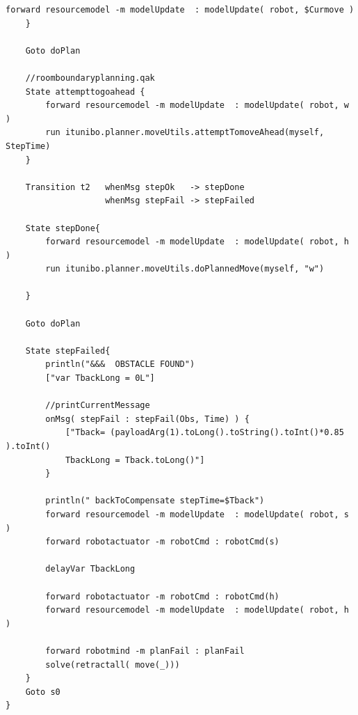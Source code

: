 \begin{lstlisting}[backgroundcolor=\color{white}, label={lst:planexecutor-ddr-sys-5}, caption={"Codice di planexecutor in ddrSystem5"}]
		forward resourcemodel -m modelUpdate  : modelUpdate( robot, $Curmove ) 
	}
	
	Goto doPlan
	
	//roomboundaryplanning.qak
	State attempttogoahead {	
		forward resourcemodel -m modelUpdate  : modelUpdate( robot, w ) 
		run itunibo.planner.moveUtils.attemptTomoveAhead(myself, StepTime)
	}
	
	Transition t2   whenMsg stepOk   -> stepDone   
					whenMsg stepFail -> stepFailed
					 
 	State stepDone{  
 		forward resourcemodel -m modelUpdate  : modelUpdate( robot, h ) 
 		run itunibo.planner.moveUtils.doPlannedMove(myself, "w")	
 		
 	}
 	
 	Goto doPlan
 	
 	State stepFailed{
 		println("&&&  OBSTACLE FOUND") 
		["var TbackLong = 0L"]		 
 	  	
		//printCurrentMessage		        
 		onMsg( stepFail : stepFail(Obs, Time) ) { 
 			["Tback= (payloadArg(1).toLong().toString().toInt()*0.85 ).toInt()
			TbackLong = Tback.toLong()"]
 		}
  		
 		println(" backToCompensate stepTime=$Tback")
 		forward resourcemodel -m modelUpdate  : modelUpdate( robot, s ) 
 		forward robotactuator -m robotCmd : robotCmd(s)
		
		delayVar TbackLong
		
		forward robotactuator -m robotCmd : robotCmd(h)
		forward resourcemodel -m modelUpdate  : modelUpdate( robot, h ) 
		
		forward robotmind -m planFail : planFail 
		solve(retractall( move(_)))	
	}
	Goto s0	
}


\end{lstlisting}


